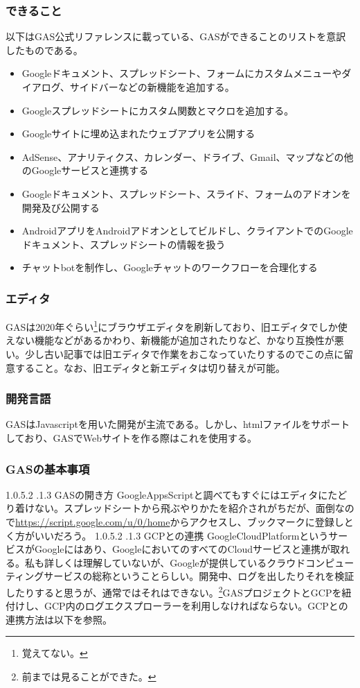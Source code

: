 \documentclass[dvipdfmx,jb5]{jarticle}
\makeatletter
\newcommand{\subsubsubsection}{\@startsection{paragraph}{4}{\z@}%
    {1.0\Cvs \@plus.5\Cdp \@minus.2\Cdp}%
    {.1\Cvs \@plus.3\Cdp}%
    {\large \bfseries}
  }
\makeatother
\begin{document}
\subsubsection{できること}
以下はGAS公式リファレンスに載っている、GASができることのリストを意訳したものである。
\begin{itemize}
\item Googleドキュメント、スプレッドシート、フォームにカスタムメニューやダイアログ、サイドバーなどの新機能を追加する。
\item Googleスプレッドシートにカスタム関数とマクロを追加する。
\item Googleサイトに埋め込まれたウェブアプリを公開する
\item AdSense、アナリティクス、カレンダー、ドライブ、Gmail、マップなどの他のGoogleサービスと連携する
\item Googleドキュメント、スプレッドシート、スライド、フォームのアドオンを開発及び公開する
\item AndroidアプリをAndroidアドオンとしてビルドし、クライアントでのGoogleドキュメント、スプレッドシートの情報を扱う
\item チャットbotを制作し、Googleチャットのワークフローを合理化する
\end{itemize}
\subsubsection{エディタ}
GASは2020年ぐらい\footnote{覚えてない。}にブラウザエディタを刷新しており、旧エディタでしか使えない機能などがあるかわり、新機能が追加されたりなど、かなり互換性が悪い。少し古い記事では旧エディタで作業をおこなっていたりするのでこの点に留意すること。なお、旧エディタと新エディタは切り替えが可能。
\subsubsection{開発言語}
GASはJavascriptを用いた開発が主流である。しかし、htmlファイルをサポートしており、GASでWebサイトを作る際はこれを使用する。
\subsubsection{GASの基本事項}
\subsubsubsection{GASの開き方}
GoogleAppsScriptと調べてもすぐにはエディタにたどり着けない。スプレッドシートから飛ぶやりかたを紹介されがちだが、面倒なので\url{https://script.google.com/u/0/home}からアクセスし、ブックマークに登録しとく方がいいだろう。
\subsubsubsection{GCPとの連携}
GoogleCloudPlatformというサービスがGoogleにはあり、GoogleにおいてのすべてのCloudサービスと連携が取れる。私も詳しくは理解していないが、Googleが提供しているクラウドコンピューティングサービスの総称ということらしい。開発中、ログを出したりそれを検証したりすると思うが、通常ではそれはできない。\footnote{前までは見ることができた。}GASプロジェクトとGCPを紐付けし、GCP内のログエクスプローラーを利用しなければならない。GCPとの連携方法は以下を参照。
\end{document}
